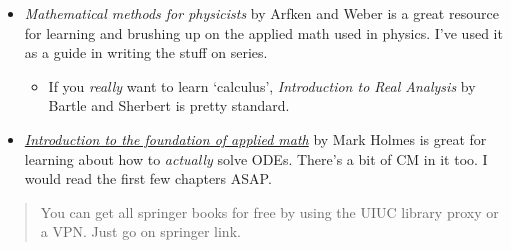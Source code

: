 \documentclass[11pt]{article}
\providecommand{\tightlist}{%
      \setlength{\itemsep}{0pt}\setlength{\parskip}{0pt}}
\begin{document}
\begin{itemize}
\item
  \emph{Mathematical methods for physicists} by Arfken and Weber is a
  great resource for learning and brushing up on the applied math used
  in physics. I've used it as a guide in writing the stuff on series.

  \begin{itemize}
  \tightlist
  \item
    If you \emph{really} want to learn `calculus', \emph{Introduction to
    Real Analysis} by Bartle and Sherbert is pretty standard.
  \end{itemize}
\item
  \emph{\href{https://link.springer.com/book/10.1007/978-0-387-87765-5}{Introduction
  to the foundation of applied math}} by Mark Holmes is great for
  learning about how to \emph{actually} solve ODEs. There's a bit of CM
  in it too. I would read the first few chapters ASAP.
\end{itemize}

\begin{quote}
You can get all springer books for free by using the UIUC library proxy
or a VPN. Just go on springer link.
\end{quote}




    
    
    
\end{document}
